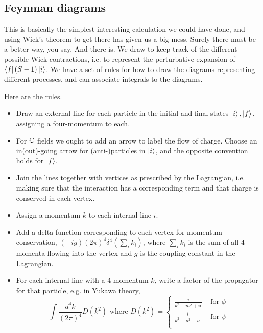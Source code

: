 
\subsection*{Feynman diagrams} This is basically the simplest interesting calculation we could have done, and using Wick's theorem to get there has given us a big mess. Surely there must be a better way, you say. And there is. We draw  to keep track of the different possible Wick contractions, i.e. to represent the perturbative expansion of $\left< f \right|(S-1)\left| i \right>$. We have a set of rules for how to draw the diagrams representing different processes, and can associate integrals to the diagrams.

Here are the rules.
\begin{itemize}
    \item Draw an external line for each particle in the initial and final states $\left| i \right>,\left| f \right>,$ assigning a four-momentum to each. 
    \item For $\mathbb{C}$ fields we ought to add an arrow to label the flow of charge. Choose an in(out)-going arrow for (anti-)particles in $\left| i \right>$, and the opposite convention holds for $\left| f \right>$.
    \item Join the lines together with vertices as prescribed by the Lagrangian, i.e. making sure that the interaction has a corresponding term and that charge is conserved in each vertex.
    \item Assign a momentum $k$ to each internal line $i$.
    \item Add a delta function corresponding to each vertex for momentum conservation, $(-ig)(2\pi)^4 \delta^4(\sum_i k_i)$, where $\sum_i k_i$ is the sum of all 4-momenta flowing into the vertex and $g$ is the coupling constant in the Lagrangian.
    \item For each internal line with a 4-momentum $k$, write a factor of the propagator for that particle, e.g. in Yukawa theory,
    $$\int \frac{d^4k}{(2\pi)^4} D(k^2)\text{ where }D(k^2)=\begin{cases}
    \frac{i}{k^2-m^2+i\epsilon} & \text{ for }\phi\\
    \frac{i}{k^2-\mu^2+i\epsilon} & \text{ for }\psi\\
    \end{cases}$$
\end{itemize}

